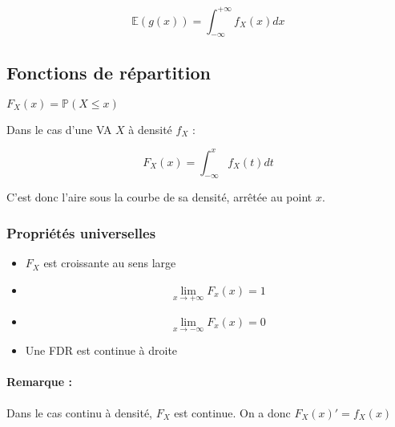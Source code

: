 \documentclass{article}
\begin{document}
$$\mathbb{E}(g(x)) = \int_{- \infty}^{+ \infty} f_{X}(x)dx $$

\subsection{Fonctions de répartition}

$F_{X}(x) = \mathbb{P}(X \leq x)$

Dans le cas d'une VA $X$ à densité $f_{X}$ :

$$F_{X}(x) = \int_{- \infty}^{x} f_{X}(t)dt $$

C'est donc l'aire sous la courbe de sa densité, arrêtée au point $x$.

\subsubsection{Propriétés universelles}

\begin{itemize}
  \item $F_{X}$ est croissante au sens large
  \item $$ \lim_{x \to + \infty} F_{x}(x) = 1 $$
  \item $$ \lim_{x \to - \infty} F_{x}(x) = 0 $$
  \item Une FDR est continue à droite
\end{itemize}

\paragraph{Remarque :} Dans le cas continu à densité, $F_{X}$ est continue.
On a donc $F_{X}(x)' = f_{X}(x)$
\end{document}
